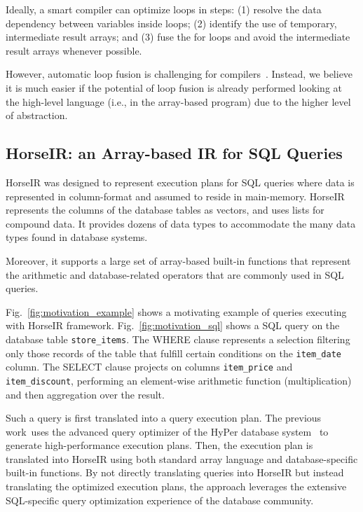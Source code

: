 
Ideally, a smart compiler can optimize loops in steps:
(1) resolve the data dependency between variables inside loops;
(2) identify the use of temporary, intermediate result arrays; and
(3) fuse the for loops and avoid the intermediate result arrays whenever possible.

However, automatic loop fusion is challenging for
compilers~\cite{Kennedy01:FastFusion,Kennedy1993:LoopFusion}.
Instead, we believe it is much easier if the potential of loop fusion is
already performed looking at the high-level language
(i.e., in the array-based program) due to the higher level of abstraction.

\subsection{HorseIR: an Array-based IR for SQL Queries}

HorseIR \OldPaper was designed to represent execution plans for SQL queries
where data is represented in column-format and assumed to reside in
main-memory. HorseIR represents the columns of the database tables as vectors,
and uses lists for compound data. It provides dozens of data types to
accommodate the many data types found in database systems. 

Moreover, it supports a large set of array-based built-in functions that
represent the arithmetic and database-related operators that are commonly used
in SQL queries.

Fig.~\ref{fig:motivation_example} shows a motivating example of queries
executing with HorseIR framework. Fig.~\ref{fig:motivation_sql} shows a SQL
query on the database table \texttt{store\_items}. The WHERE clause represents
a selection filtering only those records of the table that fulfill certain
conditions on the \texttt{item_date} column. The SELECT clause projects on
columns \texttt{item_price} and \texttt{item\_discount}, performing an
element-wise arithmetic function (multiplication) and then aggregation over the
result. 



Such a query is first translated into a query execution plan. The previous
work~\OldPaper uses the advanced query optimizer of the HyPer database
system~\cite{Neumann2011:HyPer} to generate high-performance execution plans.
Then, the execution plan is translated into HorseIR using both standard array
language and database-specific built-in functions. By not directly translating
queries into HorseIR but instead translating the optimized execution plans, the
approach leverages the extensive SQL-specific query optimization experience of
the database community.

